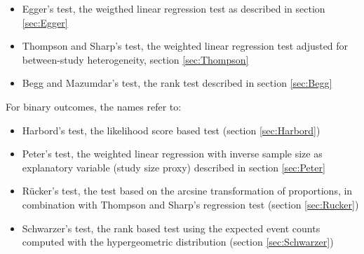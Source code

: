 \documentclass[11pt,a4paper,twoside]{book}\usepackage[]{graphicx}\usepackage[]{color}
\begin{document}
\begin{itemize}
\item Egger's test, the weigthed linear regression test as described in section \ref{sec:Egger}
\item Thompson and Sharp's test, the weighted linear regression test adjusted for between-study heterogeneity, section \ref{sec:Thompson}
\item Begg and Mazumdar's test, the rank test described in section \ref{sec:Begg}
\end{itemize}

For binary outcomes, the names refer to:
\begin{itemize}
\item Harbord's test, the likelihood score based test (section \ref{sec:Harbord})
\item Peter's test, the weighted linear regression with inverse sample size as explanatory variable (study size proxy) described in section \ref{sec:Peter}
\item R\"ucker's test, the test based on the arcsine transformation of proportions, in combination with Thompson and Sharp's regression test (section \ref{sec:Rucker})
\item Schwarzer's test, the rank based test using the expected event counts computed with the hypergeometric distribution (section \ref{sec:Schwarzer})
\end{itemize}
\end{document}
